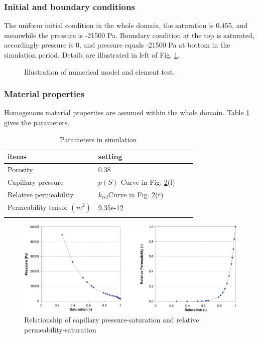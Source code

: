 \subsubsection*{Initial and boundary conditions}
The uniform initial condition in the whole domain, the saturation
is 0.455, and meanwhile the pressure is -21500 Pa. Boundary
condition at the top is saturated, accordingly pressure is 0, and
pressure equals -21500 Pa at bottom in the simulation period.
Details are
illustrated in left of Fig. \ref{us:warrick}.\\
\begin{figure}[thbp]
\centerline{}
\caption{Illustration of numerical model and element test.}
\label{us:warrick}
\end{figure}
%
\subsubsection*{Material properties}
Homogenous material properties are assumed within the whole
domain. Table \ref{us:warricksetting} gives the parameters.\\
\begin{table}[H]
 \centering
 \caption{Parameters in simulation}
 \centering \label{us:warricksetting}
 \begin{tabular}{llll}
 \hline\hline\noalign{\smallskip}
 items & setting  \\ \hline
 Porosity              & 0.38 \\
 Capillary pressure    & $p(S)$ Curve in Fig. \ref{us:warrickpks}(l) \\
 Relative permeability & $k_{rel}$Curve in Fig. \ref{us:warrickpks}(r)\\
 Permeability tensor $(m^2)$  &  9.35e-12  \\
\noalign{\smallskip}\hline\hline
 \end{tabular}
\end{table}
\begin{figure} [htb!]
 \centering 
 \includegraphics[width=0.85\columnwidth] {H_US/figures/warrick-p-k-s.eps}
 \caption{Relationship of capillary pressure-saturation and relative permeability-saturation}
 \label{us:warrickpks}
\end{figure}
